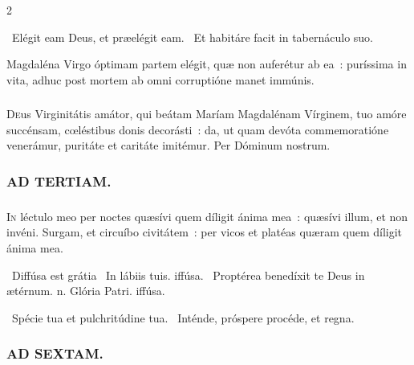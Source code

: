 \documentclass[9pt,twoside]{extarticle}
\begin{document}
\begin{multicols}{2}
{\begin{tightlist}{}
\item {}~Elégit eam Deus, et præelégit eam. ~Et habitáre facit in tabernáculo suo.
\item {} Magdaléna Virgo óptimam partem elégit, quæ non auferétur ab ea~: puríssima in vita, adhuc post mortem ab omni corruptióne manet immúnis.
\end{tightlist}

\subsubsection*{\center {}}
\lettrine{D}eus Virginitátis amátor, qui beátam Maríam Magdalénam Vírginem, tuo amóre succénsam, cœléstibus donis decorásti~: da, ut quam devóta commemoratióne venerámur, puritáte et caritáte imitémur. Per Dóminum nostrum.

\begin{tightlist}{}
\item {}
\end{tightlist}

\subsubsection*{\center \textsc{AD TERTIAM.}}
\subsubsection*{}
\lettrine{I}n léctulo meo per noctes quæsívi quem díligit ánima mea~: quæsívi illum, et non invéni. Surgam, et circuíbo civitátem~: per vicos et platéas quæram quem díligit ánima mea.

\begin{tightlist}{}
\item {}~Diffúsa est grátia \textred{*}~In lábiis tuis. iffúsa. ~Proptérea benedíxit te Deus in ætérnum. n. Glória Patri. iffúsa.
\item {}~Spécie tua et pulchritúdine tua. ~Inténde, próspere procéde, et regna.
\end{tightlist}

\subsubsection*{\center \textsc{AD SEXTAM.}}
}
\end{multicols}
\end{document}
